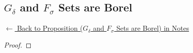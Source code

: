 
\subsection*{$G_\delta$ and $F_\sigma$ Sets are Borel}
\label{prf:borel-closed-gd-fs}

\begin{remark*}[Return]
\hyperref[prop:borel-closed-gd-fs]{$\leftarrow$ Back to Proposition ($G_\delta$ and $F_\sigma$ Sets are Borel) in Notes}
\end{remark*}

\begin{proof}
\end{proof}

\begin{remark*}

\end{remark*}

\begin{remark*}[Dependencies]

\FlashUses{}
\end{remark*}
